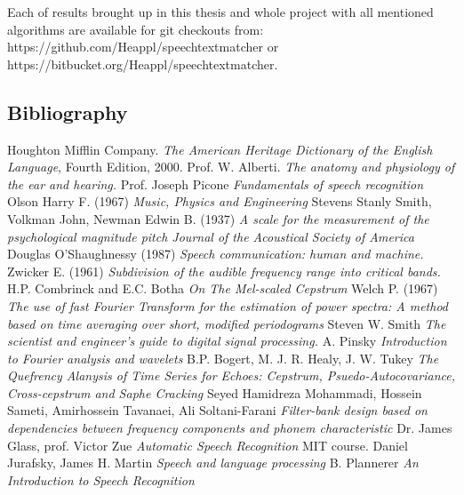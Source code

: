\documentclass[12pt,a4paper,english]{article}
\begin{document}
Each of results brought up in this thesis and whole project with all mentioned algorithms are available for git checkouts from: \newline
https://github.com/Heappl/speechtextmatcher or \newline
https://bitbucket.org/Heappl/speechtextmatcher.

\newpage
\begin{center}
    \section{Bibliography}
\end {center}

\begin{thebibliography}{99}
 Houghton Mifflin Company. \emph{The American Heritage Dictionary of the English Language}, Fourth Edition, 2000.
 Prof. W. Alberti. \emph{The anatomy and physiology of the ear and hearing.}
 Prof. Joseph Picone \emph{Fundamentals of speech recognition}
 Olson Harry F. (1967) \emph{Music, Physics and Engineering}
 Stevens Stanly Smith, Volkman John, Newman Edwin B. (1937) \emph{A scale for the measurement of the psychological magnitude pitch Journal of the Acoustical Society of America}
 Douglas O'Shaughnessy (1987) \emph{Speech communication: human and machine.}
 Zwicker E. (1961) \emph{Subdivision of the audible frequency range into critical bands.}
 H.P. Combrinck and E.C. Botha \emph{On The Mel-scaled Cepstrum}
 Welch P. (1967) \emph{The use of fast Fourier Transform for the estimation of power spectra: A method based on time averaging over short, modified periodograms}
 Steven W. Smith \emph{The scientist and engineer's guide to digital signal processing.}
\bibitem{} A. Pinsky \emph{Introduction to Fourier analysis and wavelets}
\bibitem{} B.P. Bogert, M. J. R. Healy, J. W. Tukey \emph{The Quefrency Alanysis of Time Series for Echoes: Cepstrum, Psuedo-Autocovariance, Cross-cepstrum and Saphe Cracking }
\bibitem{} Seyed Hamidreza Mohammadi, Hossein Sameti, Amirhossein Tavanaei, Ali Soltani-Farani \emph{Filter-bank design based on dependencies between frequency components and phonem characteristic}
\bibitem{} Dr. James Glass, prof. Victor Zue \emph{Automatic Speech Recognition} MIT course.
\bibitem{} Daniel Jurafsky, James H. Martin \emph{Speech and language processing}
\bibitem{} B. Plannerer \emph{An Introduction to Speech Recognition }

\end{thebibliography}
\end{document}
